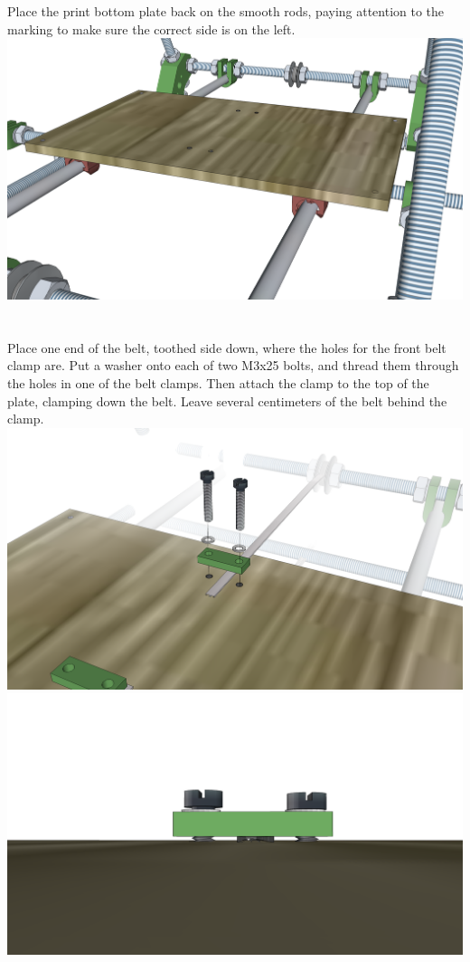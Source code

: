 \documentclass[twoside,openany,a4paper,titlepage]{memoir}
\begin{document}
	\section{}
	Place the print bottom plate back on the smooth rods, paying attention to the marking to make sure the
	correct side is on the left.\\
	\includegraphics[width=1\linewidth]{graphics/ch6_23.png}
	
	\section{}
	Place one end of the belt, toothed side down, where the holes for the front belt clamp are. Put a washer
	onto each of two M3x25 bolts, and thread them through the holes in one of the belt clamps. Then attach
	the clamp to the top of the plate, clamping down the belt. Leave several centimeters of the belt behind
	the clamp.\\
	\includegraphics[width=1\linewidth]{graphics/ch6_24_1.png}
	\includegraphics[width=1\linewidth]{graphics/ch6_24_2.png}
	
\end{document}

